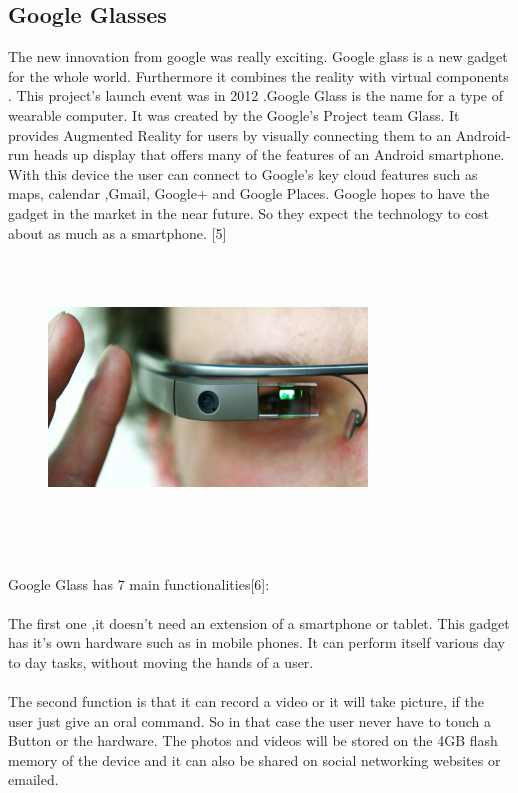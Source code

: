 \subsection{Google Glasses}
The new innovation from google was really exciting. Google glass is a new gadget for the whole world. Furthermore it combines the reality with virtual components . This project’s launch event was in 2012 .Google Glass is the name for a type of wearable computer. It was created by the Google’s Project team Glass. It provides Augmented Reality for users by visually connecting them to an Android-run heads up display that offers many of the features of an Android smartphone. With this device the user can connect to Google’s key cloud features such as maps, calendar ,Gmail, Google+ and Google Places. Google hopes to have the gadget in the market in the near future. So they expect the technology to cost about as much as a smartphone. [5]
\\
\\
\begin{figure}[htbp]
\centering
\includegraphics[width=240pt,height=180pt,keepaspectratio]{graphics/GoogleGlasses.jpg}
\caption{\cite{javaObjectClass}}
\end{figure}
\\
\\
Google Glass has 7 main functionalities[6]:
\\
\\
The first one ,it doesn’t need an extension of a smartphone or tablet. This gadget has it’s own hardware such as in mobile phones. It can perform itself various day to day tasks, without moving the hands of a user. 
\\
\\
The second function is that it can record a video or it will take picture, if the user just give an oral command. So in that case the user never have to touch a Button or the hardware. The photos and videos will be stored on the 4GB flash memory of the device and it can also be shared on social networking websites or emailed.
